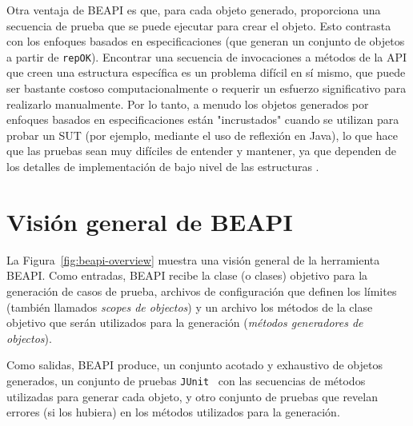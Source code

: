 Otra ventaja de \textsf{BEAPI} es que, para cada objeto generado, proporciona una secuencia de prueba que se puede ejecutar para crear el objeto. 
Esto contrasta con los enfoques basados en especificaciones (que generan un conjunto de objetos a partir de \texttt{repOK}). 
Encontrar una secuencia de invocaciones a métodos de la API que creen una estructura específica es un problema difícil en sí mismo, 
que puede ser bastante costoso computacionalmente \cite{Braione17} o requerir un esfuerzo significativo para realizarlo manualmente. 
Por lo tanto, a menudo los objetos generados por enfoques basados en especificaciones están "incrustados" cuando se utilizan para probar un SUT 
(por ejemplo, mediante el uso de reflexión en Java), lo que hace que las pruebas sean muy difíciles de entender y mantener, ya que dependen de los detalles de implementación de bajo nivel de las estructuras \cite{Braione17}.



\section{Visión general de BEAPI}

La Figura~\ref{fig:beapi-overview} muestra una visión general de la herramienta BEAPI. 
Como entradas, BEAPI recibe la clase (o clases) objetivo para la generación de casos de prueba, 
archivos de configuración que definen los límites (también llamados \emph{scopes de objectos}) 
y un archivo los métodos de la clase objetivo que serán utilizados para la generación (\emph{métodos generadores de objectos}).


Como salidas, BEAPI produce, un conjunto acotado y exhaustivo de objetos generados, 
un conjunto de pruebas \texttt{JUnit}~\cite{junit} con las secuencias de métodos utilizadas para generar cada objeto,
y otro conjunto de pruebas que revelan errores (si los hubiera) en los métodos utilizados para la generación.





